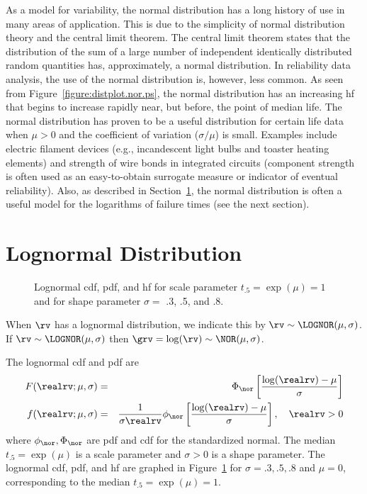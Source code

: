 As a model for variability, the normal distribution has a long history
of use in many areas of application. This is due to the simplicity of
normal distribution theory and the central limit theorem.  The central
limit theorem states that the distribution of the sum of a large
number of independent identically distributed random quantities has,
approximately, a normal distribution.  In reliability data analysis,
the use of the normal distribution is, however, less common.  As seen
from Figure~\ref{figure:distplot.nor.ps}, the normal distribution has
an increasing hf that begins to increase rapidly near, but before, the
point of median life.  The normal distribution has proven to be a
useful distribution for certain life data when $\mu>0$ and the
coefficient of variation ($\sigma/\mu$) is small.  Examples include
electric filament devices (e.g., incandescent light bulbs and toaster
heating elements) and strength of wire bonds in integrated circuits
(component strength is often used as an easy-to-obtain surrogate
measure or indicator of eventual reliability).  Also, as described in
Section~\ref{section:lognormal.distribution.def}, the normal
distribution is often a useful model for the logarithms of failure
times (see the next section).

\section{Lognormal Distribution}
\label{section:lognormal.distribution.def}
\begin{figure}
\caption{Lognormal cdf, pdf, and hf for scale parameter
$t_{.5}=\exp(\mu)=1$ and for shape parameter $\sigma=$ .3, .5,  and .8.}
\label{figure:distplot.lnor.ps}
\end{figure}
When $\rv$ has a lognormal distribution, we indicate this by $\rv
\sim \LOGNOR (\mu,\sigma)$.  If $\rv \sim \LOGNOR (\mu,\sigma)$ then
$\grv=\log(\rv) \sim \NOR(\mu, \sigma)$. 

The lognormal cdf and pdf are
\begin{eqnarray}  
\label{equation:lognormal.cdf}
 F(\realrv;\mu, \sigma)&=&\Phi_{\nor}\left [\frac{\log(\realrv)-\mu}{\sigma}
\right ]\\
 f(\realrv;\mu, \sigma)&=&\frac{1}{ \sigma \realrv} \phi_{\nor}
\left [ 
\frac{\log(\realrv)-\mu}{\sigma} \right], \quad \realrv > 0
 \end{eqnarray} 
where $\phi_{\nor}, \Phi_{\nor}$ are pdf and cdf for the
standardized normal. The median $t_{.5}=\exp(\mu)$ is a scale parameter and
$\sigma > 0$ is a shape parameter.
The lognormal cdf, pdf, and hf
are graphed in Figure~\ref{figure:distplot.lnor.ps}
for $\sigma=.3, .5,.8$ and $\mu=0$, corresponding to the 
median $t_{.5}=\exp(\mu)=1$.


